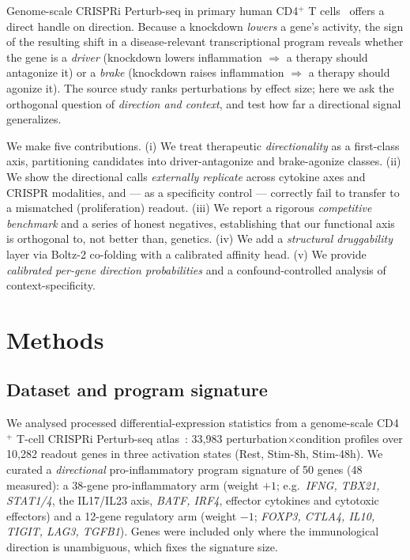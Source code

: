 \documentclass[10pt,twocolumn]{article}
\begin{document}
Genome-scale CRISPRi Perturb-seq in primary human CD4$^+$ T cells~\citep{marson2025} offers a direct handle on direction. Because a knockdown \emph{lowers} a gene's activity, the sign of the resulting shift in a disease-relevant transcriptional program reveals whether the gene is a \emph{driver} (knockdown lowers inflammation $\Rightarrow$ a therapy should antagonize it) or a \emph{brake} (knockdown raises inflammation $\Rightarrow$ a therapy should agonize it). The source study ranks perturbations by effect size; here we ask the orthogonal question of \emph{direction and context}, and test how far a directional signal generalizes.

We make five contributions. (i) We treat therapeutic \emph{directionality} as a first-class axis, partitioning candidates into driver-antagonize and brake-agonize classes. (ii) We show the directional calls \emph{externally replicate} across cytokine axes and CRISPR modalities, and --- as a specificity control --- correctly fail to transfer to a mismatched (proliferation) readout. (iii) We report a rigorous \emph{competitive benchmark} and a series of honest negatives, establishing that our functional axis is orthogonal to, not better than, genetics. (iv) We add a \emph{structural druggability} layer via Boltz-2 co-folding with a calibrated affinity head. (v) We provide \emph{calibrated per-gene direction probabilities} and a confound-controlled analysis of context-specificity.

\section{Methods}
\subsection{Dataset and program signature}
We analysed processed differential-expression statistics from a genome-scale CD4$^+$ T-cell CRISPRi Perturb-seq atlas~\citep{marson2025}: 33{,}983 perturbation$\times$condition profiles over 10{,}282 readout genes in three activation states (Rest, Stim-8h, Stim-48h). We curated a \emph{directional} pro-inflammatory program signature of 50 genes (48 measured): a 38-gene pro-inflammatory arm (weight $+1$; e.g.\ \textit{IFNG, TBX21, STAT1/4}, the IL17/IL23 axis, \textit{BATF, IRF4}, effector cytokines and cytotoxic effectors) and a 12-gene regulatory arm (weight $-1$; \textit{FOXP3, CTLA4, IL10, TIGIT, LAG3, TGFB1}). Genes were included only where the immunological direction is unambiguous, which fixes the signature size.
\end{document}
